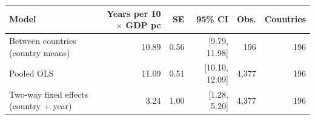 \small
\begin{tabular}{lrrrrr}
\toprule
Model & Years per 10$\times$ GDP pc & SE & 95\% CI & Obs. & Countries \\
\midrule
Between countries (country means) & 10.89 & 0.56 & [9.79, 11.98] & 196 & 196 \\
Pooled OLS & 11.09 & 0.51 & [10.10, 12.09] & 4,377 & 196 \\
Two-way fixed effects (country + year) & 3.24 & 1.00 & [1.28, 5.20] & 4,377 & 196 \\
\bottomrule
\end{tabular}
